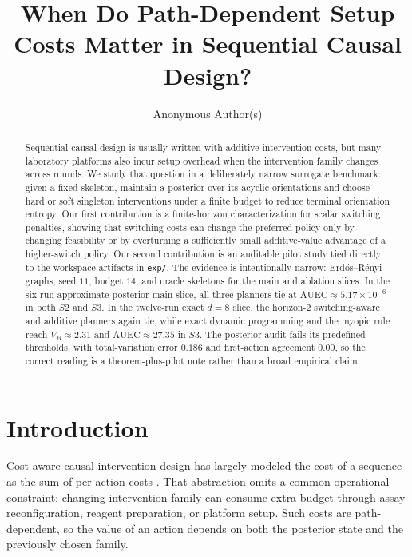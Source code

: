 \documentclass[10pt]{article}
\title{When Do Path-Dependent Setup Costs Matter in Sequential Causal Design?}
\author{Anonymous Author(s)}
\date{}
\newcommand{\AUEC}{\mathrm{AUEC}}
\begin{document}
\maketitle

\begin{abstract}
Sequential causal design is usually written with additive intervention costs, but many laboratory platforms also incur setup overhead when the intervention family changes across rounds. We study that question in a deliberately narrow surrogate benchmark: given a fixed skeleton, maintain a posterior over its acyclic orientations and choose hard or soft singleton interventions under a finite budget to reduce terminal orientation entropy. Our first contribution is a finite-horizon characterization for scalar switching penalties, showing that switching costs can change the preferred policy only by changing feasibility or by overturning a sufficiently small additive-value advantage of a higher-switch policy. Our second contribution is an auditable pilot study tied directly to the workspace artifacts in \texttt{exp/}. The evidence is intentionally narrow: Erd\H{o}s--R\'enyi graphs, seed $11$, budget $14$, and oracle skeletons for the main and ablation slices. In the six-run approximate-posterior main slice, all three planners tie at \(\AUEC \approx 5.17\times 10^{-6}\) in both $S2$ and $S3$. In the twelve-run exact $d{=}8$ slice, the horizon-2 switching-aware and additive planners again tie, while exact dynamic programming and the myopic rule reach \(V_B \approx 2.31\) and \(\AUEC \approx 27.35\) in $S3$. The posterior audit fails its predefined thresholds, with total-variation error \(0.186\) and first-action agreement \(0.00\), so the correct reading is a theorem-plus-pilot note rather than a broad empirical claim.
\end{abstract}

\section{Introduction}
Cost-aware causal intervention design has largely modeled the cost of a sequence as the sum of per-action costs \citep{kocaoglu2017cost,ghassami2018budgeted,lindgren2018experimental,agrawal2019abcdstrategy}. That abstraction omits a common operational constraint: changing intervention family can consume extra budget through assay reconfiguration, reagent preparation, or platform setup. Such costs are path-dependent, so the value of an action depends on both the posterior state and the previously chosen family.
\end{document}
